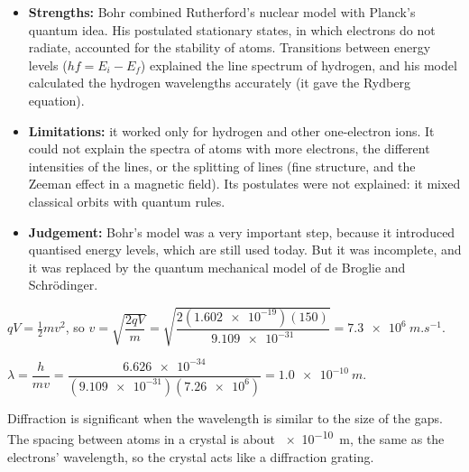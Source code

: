 \documentclass[12pt]{article}
\begin{document}
\ansq
\begin{crit}
\end{crit}
\sample
\begin{itemize}
  \item \textbf{Strengths:} Bohr combined Rutherford's nuclear model with Planck's quantum idea. His
        postulated stationary states, in which electrons do not radiate, accounted for the stability of atoms.
        Transitions between energy levels ($hf = E_i - E_f$) explained the line spectrum of hydrogen, and
        his model calculated the hydrogen wavelengths accurately (it gave the Rydberg equation).
  \item \textbf{Limitations:} it worked only for hydrogen and other one-electron ions. It could not
        explain the spectra of atoms with more electrons, the different intensities of the lines, or the
        splitting of lines (fine structure, and the Zeeman effect in a magnetic field). Its postulates were
        not explained: it mixed classical orbits with quantum rules.
  \item \textbf{Judgement:} Bohr's model was a very important step, because it introduced quantised
        energy levels, which are still used today. But it was incomplete, and it was replaced by the
        quantum mechanical model of de Broglie and Schrödinger.
\end{itemize}

\ansq
{}
\begin{crit}
\end{crit}
\sample
$qV = \frac{1}{2}mv^2$, so $v = \sqrt{\dfrac{2qV}{m}} = \sqrt{\dfrac{2(\num{1.602e-19})(150)}{\num{9.109e-31}}}
= \qty{7.3e6}{m.s^{-1}}$.
\begin{crit}
\end{crit}
\sample
$\lambda = \dfrac{h}{mv} = \dfrac{\num{6.626e-34}}{(\num{9.109e-31})(\num{7.26e6})} = \qty{1.0e-10}{m}$.
\begin{crit}
\end{crit}
\sample
Diffraction is significant when the wavelength is similar to the size of the gaps. The spacing between
atoms in a crystal is about \qty{e-10}{m}, the same as the electrons' wavelength, so the crystal acts like
a diffraction grating.
\end{document}
